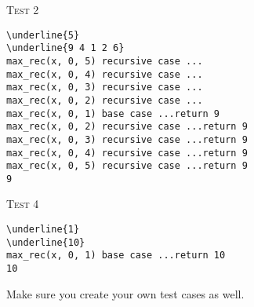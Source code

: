 \textsc{Test 2}
\begin{Verbatim}[commandchars=\\\{\}, fontsize=\small, frame=single]
\underline{5}
\underline{9 4 1 2 6}
max_rec(x, 0, 5) recursive case ...
max_rec(x, 0, 4) recursive case ...
max_rec(x, 0, 3) recursive case ...
max_rec(x, 0, 2) recursive case ...
max_rec(x, 0, 1) base case ...return 9
max_rec(x, 0, 2) recursive case ...return 9
max_rec(x, 0, 3) recursive case ...return 9
max_rec(x, 0, 4) recursive case ...return 9
max_rec(x, 0, 5) recursive case ...return 9
9
\end{Verbatim}

\textsc{Test 4}
\begin{Verbatim}[commandchars=\\\{\}, fontsize=\small, frame=single]
\underline{1}
\underline{10}
max_rec(x, 0, 1) base case ...return 10
10
\end{Verbatim}


Make sure you create your own test cases as well.
